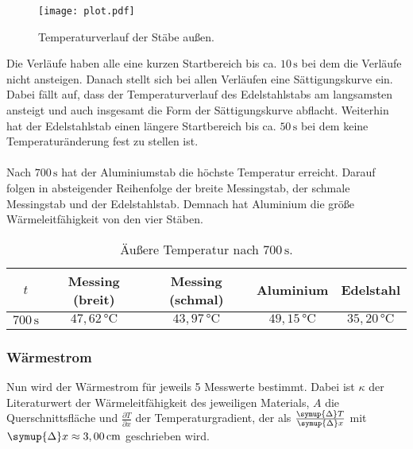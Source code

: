 \begin{figure}[h]
  \centering
  \texttt{[image: plot.pdf]}
  \caption{Temperaturverlauf der Stäbe außen.}
  \label{fig:T1T4}
\end{figure}
Die Verläufe haben alle eine kurzen Startbereich bis ca. $10 \,\si{\second}$ bei dem die Verläufe nicht
ansteigen. Danach stellt sich bei allen Verläufen eine Sättigungskurve ein.
Dabei fällt auf, dass der Temperaturverlauf des Edelstahlstabs am langsamsten
ansteigt und auch insgesamt die Form der Sättigungskurve abflacht. Weiterhin hat der Edelstahlstab einen längere Startbereich bis ca. $50\,\si{\second}$
bei dem keine Temperaturänderung fest zu stellen ist.\\
\\
Nach $700\,\si{\second}$ hat der Aluminiumstab die höchste Temperatur erreicht. Darauf folgen in absteigender Reihenfolge der breite Messingstab, der schmale Messingstab
und der Edelstahlstab. Demnach hat Aluminium die größe Wärmeleitfähigkeit von den vier Stäben.
\begin{table}[h]
  \centering
  \caption{Äußere Temperatur nach $700\,\si{\second}$.}
  \label{tab:700s}
  \begin{tabular}{c c c c c}
    \toprule
    $t$ & Messing (breit) & Messing (schmal) & Aluminium & Edelstahl \\
    \midrule
    $700\,\si{\second}$ & $47,62\,\si{\celsius}$ & $43,97\,\si{\celsius}$ & $49,15\,\si{\celsius}$ & $35,20\,\si{\celsius}$ \\
    \bottomrule
  \end{tabular}
\end{table}

\subsubsection{Wärmestrom}
\label{sec:waermestrom}
Nun wird der Wärmestrom für jeweils 5 Messwerte bestimmt. Dabei ist $\kappa$ der Literaturwert der Wärmeleitfähigkeit des jeweiligen
Materials, $A$ die Querschnittsfläche und $\frac{\partial T}{\partial x}$ der Temperaturgradient, der als $\frac{\symup{\Delta} T}{\symup{\Delta} x}$
mit $\symup{\Delta}x \approx 3,00\,\si{\centi\meter}$ geschrieben wird.

